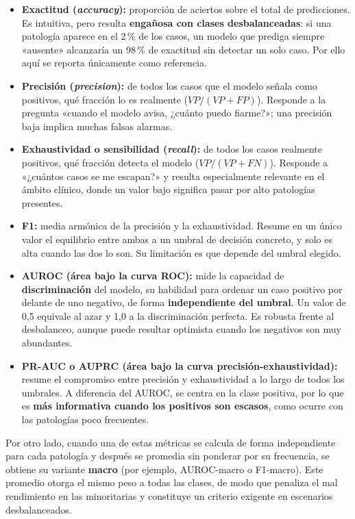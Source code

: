 \begin{itemize}
  \item \textbf{Exactitud (\textit{accuracy}):} proporción de aciertos sobre el total
        de predicciones. Es intuitiva, pero resulta \textbf{engañosa con clases
        desbalanceadas}: si una patología aparece en el 2\,\% de los casos, un modelo
        que prediga siempre «ausente» alcanzaría un 98\,\% de exactitud sin detectar un
        solo caso. Por ello aquí se reporta únicamente como referencia.
  \item \textbf{Precisión (\textit{precision}):} de todos los casos que el modelo
        señala como positivos, qué fracción lo es realmente ($VP/(VP+FP)$). Responde a
        la pregunta «cuando el modelo avisa, ¿cuánto puedo fiarme?»; una precisión baja
        implica muchas falsas alarmas.
  \item \textbf{Exhaustividad o sensibilidad (\textit{recall}):} de todos los casos
        realmente positivos, qué fracción detecta el modelo ($VP/(VP+FN)$). Responde a
        «¿cuántos casos se me escapan?» y resulta especialmente relevante en el ámbito
        clínico, donde un valor bajo significa pasar por alto patologías presentes.
  \item \textbf{F1:} media armónica de la precisión y la exhaustividad. Resume en un
        único valor el equilibrio entre ambas a un umbral de decisión concreto, y solo
        es alta cuando las dos lo son. Su limitación es que depende del umbral elegido.
  \item \textbf{AUROC (área bajo la curva ROC):} mide la capacidad de
        \textbf{discriminación} del modelo, su habilidad para ordenar un caso positivo
        por delante de uno negativo, de forma \textbf{independiente del umbral}. Un
        valor de 0,5 equivale al azar y 1,0 a la discriminación perfecta. Es robusta
        frente al desbalanceo, aunque puede resultar optimista cuando los negativos son
        muy abundantes.
  \item \textbf{PR-AUC o AUPRC (área bajo la curva precisión-exhaustividad):} resume el
        compromiso entre precisión y exhaustividad a lo largo de todos los umbrales. A
        diferencia del AUROC, se centra en la clase positiva, por lo que es \textbf{más
        informativa cuando los positivos son escasos}, como ocurre con las patologías
        poco frecuentes.
\end{itemize}

Por otro lado, cuando una de estas métricas se calcula de forma independiente para
cada patología y después se promedia sin ponderar por su frecuencia, se obtiene su
variante \textbf{macro} (por ejemplo, AUROC-macro o F1-macro). Este promedio otorga el
mismo peso a todas las clases, de modo que penaliza el mal rendimiento en las
minoritarias y constituye un criterio exigente en escenarios desbalanceados.

